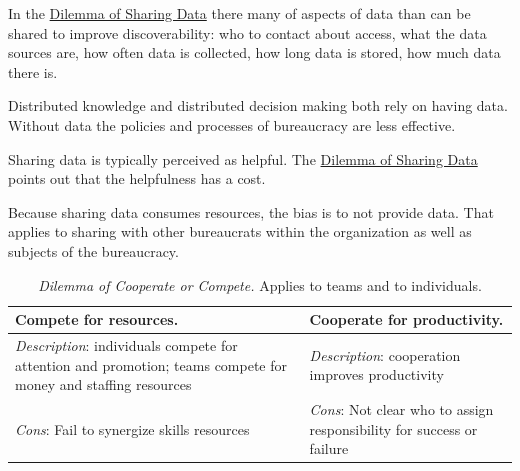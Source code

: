 In the \href{table:data-share-vs-hide}{Dilemma of Sharing Data} there many of aspects of data than can be shared to improve discoverability: who to contact about access, what the data sources are, how often data is collected, how long data is stored, how much data there is.

Distributed knowledge and distributed decision making both rely on having data. Without data the policies and processes of bureaucracy are less effective. 

Sharing data is typically perceived as helpful. 
The \href{table:data-share-vs-hide}{Dilemma of Sharing Data} points out that the helpfulness has a cost. 

Because sharing data consumes resources, the bias is to not provide data. That applies to sharing with other bureaucrats within the organization as well as subjects of the bureaucracy. 


\begin{center}
\begin{table}[H] %
\begin{tabular}{ | m{\dilemmatablewidth}| m{\dilemmatablewidth} | } 
  \hline
  \textbf{Compete for resources.} &
  \textbf{Cooperate for productivity.} \\
  \hline
  \textit{Description}: individuals compete for attention and promotion; teams compete for money and staffing resources &
  \textit{Description}: cooperation improves productivity \\  
  \hline
  \textit{Cons}: Fail to synergize skills resources & 
  \textit{Cons}: Not clear who to assign responsibility for success or failure \\
  \hline
\end{tabular}
\caption{
\textit{Dilemma of Cooperate or Compete.} 
Applies to teams and to individuals. 
}
\label{table:cooperate-vs-compete}
\end{table}
\end{center}



